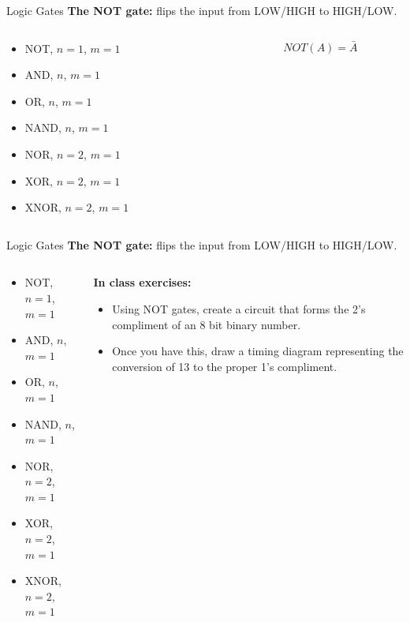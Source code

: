 \documentclass{beamer}
\begin{document}
\begin{frame}{Logic Gates}
\textbf{The NOT gate:} flips the input from LOW/HIGH to HIGH/LOW. \\ \vspace{0.5cm}
\begin{columns}[T]
\begin{column}{0.5\textwidth}
\begin{itemize}
\item \alert{NOT, $n=1$, $m=1$}
\item AND, $n$, $m=1$
\item OR, $n$, $m=1$
\item NAND, $n$, $m=1$
\item NOR, $n=2$, $m=1$
\item XOR, $n=2$, $m=1$
\item XNOR, $n=2$, $m=1$
\end{itemize}
\end{column}
\begin{column}{0.5\textwidth}
\begin{equation}
NOT (A) = \bar{A}
\end{equation}
\end{column}
\end{columns}
\end{frame}

\begin{frame}{Logic Gates}
\textbf{The NOT gate:} flips the input from LOW/HIGH to HIGH/LOW. \\ \vspace{0.5cm}
\begin{columns}[T]
\begin{column}{0.5\textwidth}
\begin{itemize}
\item \alert{NOT, $n=1$, $m=1$}
\item AND, $n$, $m=1$
\item OR, $n$, $m=1$
\item NAND, $n$, $m=1$
\item NOR, $n=2$, $m=1$
\item XOR, $n=2$, $m=1$
\item XNOR, $n=2$, $m=1$
\end{itemize}
\end{column}
\begin{column}{0.5\textwidth}
\textbf{In class exercises:}
\small
\begin{itemize}
\item Using NOT gates, create a circuit that forms the 2's compliment of an 8 bit binary number.
\item Once you have this, draw a timing diagram representing the conversion of 13 to the proper 1's compliment.
\end{itemize}
\end{column}
\end{columns}
\end{frame}
\end{document}
